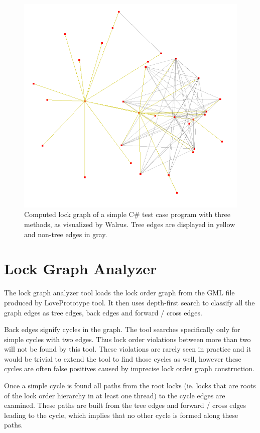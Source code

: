 \begin{figure}[H]
\begin{center}
\includegraphics[scale=0.5]{LockGraph.png}
\end{center}
\caption{Computed lock graph of a simple C\# test case program with three methods, as visualized by Walrus. Tree edges are displayed in yellow and non-tree edges in gray.}
\end{figure}

\section{Lock Graph Analyzer}

The lock graph analyzer tool loads the lock order graph from the GML file produced by LovePrototype tool. It then uses depth-first search to classify all the graph edges as tree edges, back edges and forward / cross edges.

Back edges signify cycles in the graph. The tool searches specifically only for simple cycles with two edges. Thus lock order violations between more than two will not be found by this tool. These violations are rarely seen in practice and it would be trivial to extend the tool to find those cycles as well, however these cycles are often false positives caused by imprecise lock order graph construction.

Once a simple cycle is found all paths from the root locks (ie. locks that are roots of the lock order hierarchy in at least one thread) to the cycle edges are examined. These paths are built from the tree edges and forward / cross edges leading to the cycle, which implies that no other cycle is formed along these paths.

